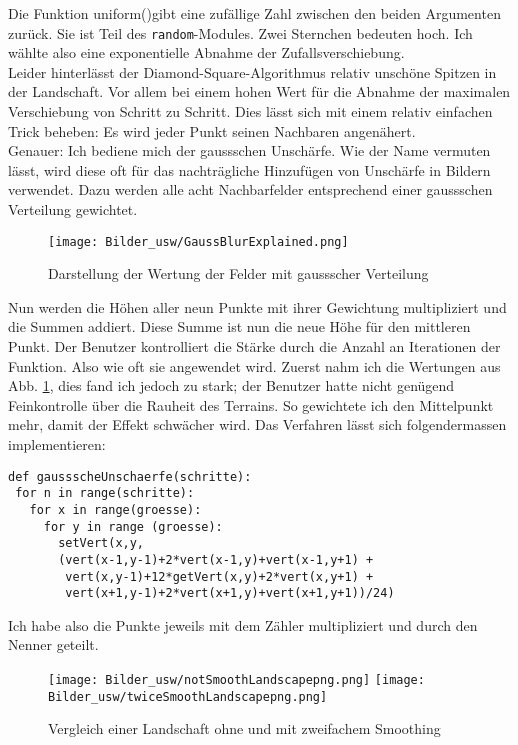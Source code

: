 \documentclass[12pt,twoside]{book}
\begin{document}
Die Funktion \glqq uniform()\grqq{ }gibt eine zuf\"allige Zahl zwischen den beiden Argumenten zur\"uck. Sie ist Teil des \texttt{random}-Modules.
Zwei Sternchen bedeuten \glqq hoch\grqq.
Ich w\"ahlte also eine exponentielle Abnahme der Zufallsverschiebung.
\\
Leider hinterl\"asst der Diamond-Square-Algorithmus relativ unsch\"one Spitzen in der Landschaft. Vor allem bei einem hohen Wert f\"ur die Abnahme der maximalen Verschiebung von Schritt zu Schritt.
Dies l\"asst sich mit einem relativ einfachen Trick beheben: Es wird jeder Punkt seinen Nachbaren angen\"ahert. \\
Genauer: Ich bediene mich der gaussschen Unsch\"arfe. Wie der Name vermuten l\"asst, wird diese oft f\"ur das nachtr\"agliche Hinzuf\"ugen von Unsch\"arfe in Bildern verwendet. Dazu werden alle acht Nachbarfelder entsprechend einer gaussschen Verteilung gewichtet.
\begin{figure}[H]
\centering
\texttt{[image: Bilder\_usw/GaussBlurExplained.png]}
\caption{Darstellung der Wertung der Felder mit gaussscher Verteilung}
\label{fig:Gauss}
\centering
\end{figure}
Nun werden die H\"ohen aller neun Punkte mit ihrer Gewichtung multipliziert und die Summen addiert. Diese Summe ist nun die neue H\"ohe f\"ur den mittleren Punkt.
Der Benutzer kontrolliert die St\"arke durch die Anzahl an Iterationen der Funktion. Also wie oft sie angewendet wird.
Zuerst nahm ich die Wertungen aus Abb. \ref{fig:Gauss}, dies fand ich jedoch zu stark; der Benutzer hatte nicht gen\"ugend Feinkontrolle \"uber die Rauheit des Terrains. So gewichtete ich den Mittelpunkt mehr, damit der Effekt schw\"acher wird.
Das Verfahren l\"asst sich folgendermassen implementieren:
\\
\begin{lstlisting}
def gaussscheUnschaerfe(schritte):
 for n in range(schritte):
   for x in range(groesse):
     for y in range (groesse):
       setVert(x,y,
       (vert(x-1,y-1)+2*vert(x-1,y)+vert(x-1,y+1) +
        vert(x,y-1)+12*getVert(x,y)+2*vert(x,y+1) +
        vert(x+1,y-1)+2*vert(x+1,y)+vert(x+1,y+1))/24)
\end{lstlisting}
Ich habe also die Punkte jeweils mit dem Z\"ahler multipliziert und durch den Nenner geteilt.
\begin{figure}[H]
\centering
\texttt{[image: Bilder\_usw/notSmoothLandscapepng.png]}
\texttt{[image: Bilder\_usw/twiceSmoothLandscapepng.png]}
 \caption{Vergleich einer Landschaft ohne und mit zweifachem Smoothing}
  \label{fig:LandschaftSmoothing}
\centering

\end{figure}
\end{document}
